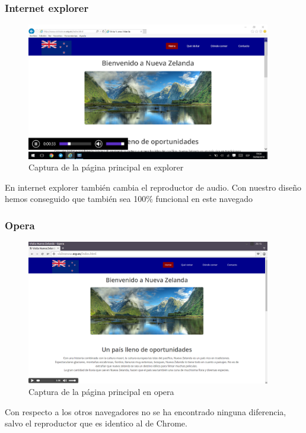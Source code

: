 \subsubsection{Internet explorer}
\begin{figure}[h]
	\centering
	\includegraphics[width=0.95\textwidth]{./Fotos/explorer-capture.png}
	\caption{Captura de la página principal en explorer}
	\label{fig: ejemplo}
\end{figure}
En internet explorer también cambia el reproductor de audio. Con nuestro diseño hemos conseguido que también sea 100\% funcional en este navegado
\subsubsection{Opera}
\begin{figure}[h]
	\centering
	\includegraphics[width=0.95\textwidth]{./Fotos/opera-capture.png}
	\caption{Captura de la página principal en opera}
	\label{fig: ejemplo}
\end{figure}
Con respecto a los otros navegadores no se ha encontrado ninguna diferencia, salvo el reproductor que es identico al de Chrome.
